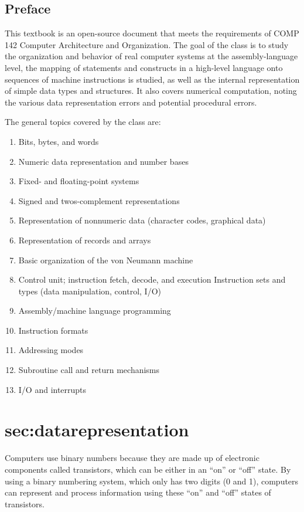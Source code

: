 \documentclass[letterpaper, 12pt]{book}
\begin{document}

\section{Preface\label{sec:preface}}

This textbook is an open-source document that meets the requirements of COMP 142 Computer Architecture and Organization. The goal of the class is to study the organization and behavior of real computer systems at the assembly-language level, the mapping of statements and constructs in a high-level language onto sequences of machine instructions is studied, as well as the internal representation of simple data types and structures. It also covers numerical computation, noting the various data representation errors and potential procedural errors.

The general topics covered by the class are:

\begin{enumerate}
\item Bits, bytes, and words
\item Numeric data representation and number bases
\item Fixed- and floating-point systems
\item Signed and twos-complement representations
\item Representation of nonnumeric data (character codes, graphical data)
\item Representation of records and arrays
\item Basic organization of the von Neumann machine
\item Control unit; instruction fetch, decode, and execution
    Instruction sets and types (data manipulation, control, I/O)
\item Assembly/machine language programming
\item Instruction formats
\item Addressing modes
\item Subroutine call and return mechanisms
\item I/O and interrupts
\end{enumerate}



\chapter{sec:datarepresentation}

Computers use binary numbers because they are made up of electronic components called transistors, 
which can be either in an ``on'' or ``off'' state. By using a binary numbering system, which only 
has two digits (0 and 1), computers can represent and process information using these ``on'' and 
``off'' states of transistors.
\end{document}
